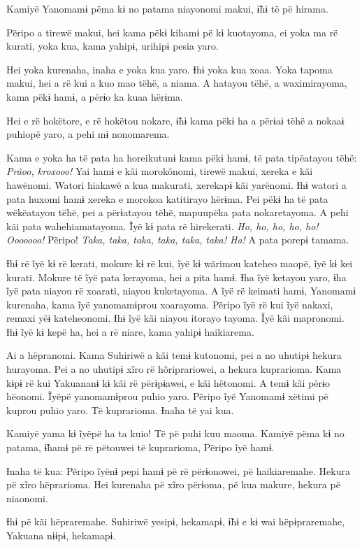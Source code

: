 Kamiyë Yanomamɨ pëma kɨ no patama niayonomi makui, ɨ̃hɨ të pë hirama. 

Pẽripo a tirewë makui, hei kama pëkɨ kihamɨ pë kɨ kuotayoma, ei yoka ma
 rë kurati, yoka kua, kama yahipɨ, urihipɨ pesia yaro. 

Hei yoka kurenaha, inaha e yoka kua yaro. Ɨhɨ yoka kua xoaa. Yoka tapoma
makui, hei a rë kui a kuo mao tëhë, a niama. A hatayou tëhë, a
waximirayoma, kama pëkɨ hamɨ, a përɨo ka kuaa hërɨma. 

Hei e rë hokëtore, e rë hokëtou nokare, ɨ̃hɨ kama pëkɨ ha a përɨaɨ tëhë a
nokaaɨ puhiopë yaro, a pehi mɨ nonomarema. 

Kama e yoka ha të pata ha horeikutunɨ kama pëkɨ hamɨ, të pata tipëatayou
tëhë: \textit{Prãoo, kroxooo!} Yai hamɨ e kãi morokõnomi, tirewë makui, xereka e
kãi hawënomi. Watori hiakawë a kua makurati, xerekapɨ kãi yarënomi. Ɨhɨ
watori a pata huxomi hamɨ xereka e morokoa katitirayo hërɨma. Pei pëkɨ
ha të pata wëkëatayou tëhë, pei a përɨatayou tëhë, mapuupëka pata
nokaretayoma. A pehi kãi pata wahehiamatayoma. Ĩyë kɨ pata rë
hirekerati. \textit{Ho, ho, ho, ho, ho! Ooooooo!} Pẽripo! \textit{Taka, taka, taka, taka,
taka, taka! Ha!} A pata porepɨ tamama. 

Ɨhɨ rë ĩyë kɨ rë kerati, mokure kɨ rë kui, ĩyë kɨ wãrimou kateheo maopë,
 ĩyë kɨ kei kurati. Mokure të ĩyë pata kerayoma, hei a pita hamɨ. Ɨha ĩyë
 ketayou yaro, ɨha ĩyë pata niayou rë xoarati, niayou kuketayoma. A ĩyë
 rë keimati hamɨ, Yanomamɨ kurenaha, kama ĩyë yanomamɨprou xoarayoma.
 Pẽripo ĩyë rë kui ĩyë nakaxi, remaxi yëɨ kateheonomi. Ɨhɨ ĩyë kãi niayou
 itorayo tayoma. Ĩyë kãi mapronomi. Ɨhɨ ĩyë kɨ kepë ha, hei a rë niare,
 kama yahipɨ haikiarema.

Ai a hëpranomi. Kama Suhiriwë a kãi temɨ kutonomi, pei a no uhutipɨ
hekura hurayoma. Pei a no uhutipɨ xĩro rë hõriprariowei, a hekura
kuprarioma. Kama kɨpɨ rë kui Yakuananɨ kɨ kãi rë përɨpɨawei, e kãi
hëtonomi. A temɨ kãi përɨo hëonomi. Ĩyëpë yanomamɨprou puhio yaro.
Pẽripo ĩyë Yanomamɨ xëtimi pë kuprou puhio yaro. Të kuprarioma. Ɨnaha të
yai kua.

Kamiyë yama kɨ ĩyëpë ha ta kuio! Të pë puhi kuu maoma. Kamiyë pëma kɨ no
patama, ɨ̃hamɨ pë rë pëtouwei të kuprarioma, Pẽripo ĩyë hamɨ. 

Ɨnaha të kua: Pẽripo ĩyënɨ pepi hamɨ pë rë përɨonowei, pë haikiaremahe.
Hekura pë xĩro hëprarioma. Hei kurenaha pë xĩro përɨoma, pë kua makure,
hekura pë niaonomi. 

Ɨhɨ pë kãi hëpraremahe. Suhiriwë yesipɨ, hekamapɨ, ɨ̃hɨ e kɨ wai
hëpɨpraremahe, Yakuana nɨɨpɨ, hekamapɨ.

